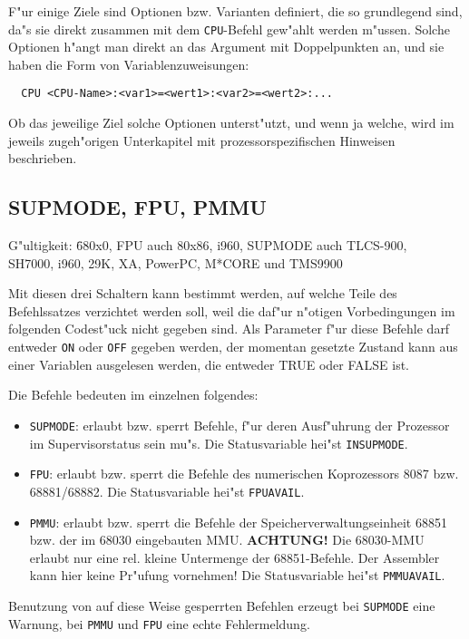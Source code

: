 \documentclass[12pt,a4paper,twoside]{report}
\makeatletter
\newcommand{\bb}[1]{{\bf #1}}
\newcommand{\tty}[1]{{\tt #1}}
\newcommand{\ttindex}[1]{\index{#1@{\tt #1}}}
\makeatother
\begin{document}
F"ur einige Ziele sind Optionen bzw. Varianten definiert, die so grundlegend
sind, da"s sie direkt zusammen mit dem \tty{CPU}-Befehl gew"ahlt werden m"ussen.
Solche Optionen h"angt man direkt an das Argument mit Doppelpunkten an, und sie
haben die Form von Variablenzuweisungen:
\begin{verbatim}
  CPU <CPU-Name>:<var1>=<wert1>:<var2>=<wert2>:...
\end{verbatim}
Ob das jeweilige Ziel solche Optionen unterst"utzt, und wenn ja welche, wird im
jeweils zugeh"origen Unterkapitel mit prozessorspezifischen Hinweisen beschrieben.


\subsection{SUPMODE, FPU, PMMU}
\ttindex{SUPMODE}\ttindex{FPU}\ttindex{PMMU}

{\em\begin{tabbing}
G"ultigkeit: \= 680x0, FPU auch 80x86, i960, SUPMODE auch TLCS-900, \\
             \> SH7000, i960, 29K, XA, PowerPC, M*CORE und TMS9900
\end{tabbing}}

Mit diesen drei Schaltern kann bestimmt werden, auf welche Teile des
Befehlssatzes verzichtet werden soll, weil die daf"ur n"otigen
Vorbedingungen im folgenden Codest"uck nicht gegeben sind.  Als
Parameter f"ur diese Befehle darf entweder \tty{ON} oder \tty{OFF} gegeben werden,
der momentan gesetzte Zustand kann aus einer Variablen ausgelesen
werden, die entweder TRUE oder FALSE ist.
\par
Die Befehle bedeuten im einzelnen folgendes:
\begin{itemize}
\item{\tty{SUPMODE}: erlaubt bzw. sperrt Befehle, f"ur deren Ausf"uhrung
      der Prozessor im Supervisorstatus sein mu"s.  Die Statusvariable
      hei"st \tty{INSUPMODE}.}
\item{\tty{FPU}: erlaubt bzw. sperrt die Befehle des numerischen Koprozessors
      8087 bzw. 68881/68882.  Die Statusvariable hei"st \tty{FPUAVAIL}.}
\item{\tty{PMMU}: erlaubt bzw. sperrt die Befehle der Speicherverwaltungseinheit
      68851 bzw. der im 68030 eingebauten MMU.  \bb{ACHTUNG!} Die 68030-MMU
      erlaubt nur eine rel. kleine Untermenge der 68851-Befehle.  Der
      Assembler kann hier keine Pr"ufung vornehmen!  Die Statusvariable hei"st
      \tty{PMMUAVAIL}.}
\end{itemize}
Benutzung von auf diese Weise gesperrten Befehlen erzeugt bei \tty{SUPMODE}
eine Warnung, bei \tty{PMMU} und \tty{FPU} eine echte Fehlermeldung.
\end{document}
